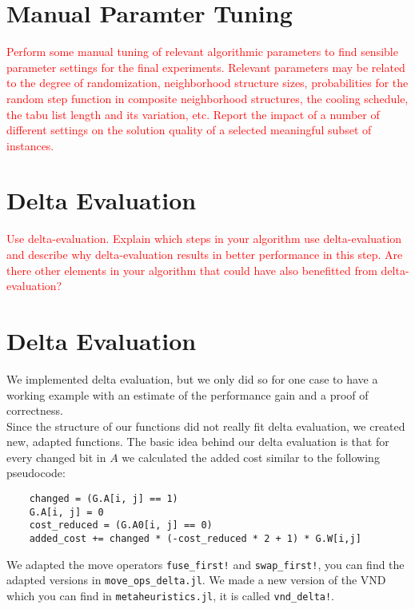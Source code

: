 \section{Manual Paramter Tuning}

\textcolor{red}{
Perform some manual tuning of relevant algorithmic parameters to find sensible parameter settings
for the final experiments. Relevant parameters may be related to the degree of randomization,
neighborhood structure sizes, probabilities for the random step function in composite neighborhood
structures, the cooling schedule, the tabu list length and its variation, etc. Report the impact of a
number of different settings on the solution quality of a selected meaningful subset of instances.}

\pagebreak

\section{Delta Evaluation}

\textcolor{red}{Use delta-evaluation.
Explain which steps in your algorithm use delta-evaluation and describe
why delta-evaluation results in better performance in this step. Are there other elements in your
algorithm that could have also benefitted from delta-evaluation?}

\section{Delta Evaluation}

We implemented delta evaluation, but we only did so for one case to have a working example with an estimate of 
the performance gain and a proof of correctness.\\
Since the structure of our functions did not really fit delta evaluation, we created new, adapted functions. 
The basic idea behind our delta evaluation is that for every changed bit in $A$ we calculated the added cost 
similar to the following pseudocode:\\

\begin{verbatim}
    changed = (G.A[i, j] == 1)
    G.A[i, j] = 0
    cost_reduced = (G.A0[i, j] == 0)
    added_cost += changed * (-cost_reduced * 2 + 1) * G.W[i,j]
\end{verbatim}

We adapted the move operators \texttt{fuse\_first!} and \texttt{swap\_first!}, you can find the adapted versions 
in \texttt{move\_ops\_delta.jl}. We made a new version of the VND which you can find in \texttt{metaheuristics.jl}, 
it is called \texttt{vnd\_delta!}.\\

